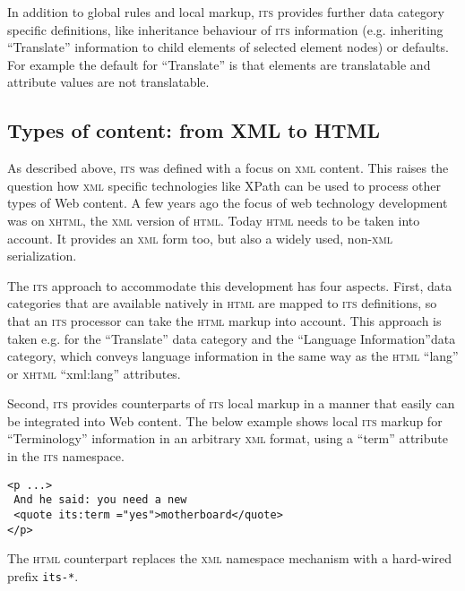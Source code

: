 \documentclass[output=paper]{LSP/langsci}
\begin{document}
In addition to global rules and local markup, \textsc{its} provides further data category specific definitions, like inheritance behaviour of \textsc{its} information (e.g. inheriting ``Translate'' information to child elements of selected element nodes) or defaults. For example the default for ``Translate'' is that elements are translatable and attribute values are not translatable.

\subsection{Types of content: from XML to HTML}\label{sec:sasaki:3.2}

As described above, \textsc{its } was defined with a focus on \textsc{xml} content. This raises the question how \textsc{xml} specific technologies like XPath can be used to process other types of Web content. A few years ago the focus of web technology development was on \textsc{xhtml}, the \textsc{xml} version of \textsc{html}. Today \textsc{html} needs to be taken into account. It provides an \textsc{xml} form too, but also a widely used, non-\textsc{xml} serialization.

The \textsc{its } approach to accommodate this development has four aspects. First, data categories that are available natively in \textsc{html} are mapped to \textsc{its } definitions, so that an \textsc{its } processor can take the \textsc{html} markup into account. This approach is taken e.g. for the ``Translate'' data category and the ``Language Information''data category, which conveys language information in the same way as the \textsc{html} ``lang'' or \textsc{xhtml} ``xml:lang'' attributes.

Second, \textsc{its } provides counterparts of \textsc{its} local markup in a manner that easily can be integrated into Web content. The below example shows local \textsc{its} markup for ``Terminology'' information in an arbitrary \textsc{xml} format, using a ``term'' attribute in the \textsc{its} namespace.

\begin{lstlisting}[escapechar=@]
<p ...>
 And he said: you need a new 
 <quote its:term ="yes">motherboard</quote> 
</p>
\end{lstlisting}



The \textsc{html} counterpart replaces the \textsc{xml} namespace mechanism with a 
hard-wired prefix \texttt{its-*}.
\end{document}
